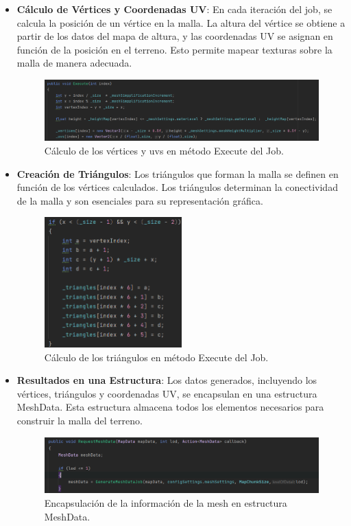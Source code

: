 \begin{itemize}
\item \textbf{Cálculo de Vértices y Coordenadas UV}: En cada iteración del job, se calcula la posición de un vértice en la malla. La altura del vértice se obtiene a partir de los datos del mapa de altura, y las coordenadas UV se asignan en función de la posición en el terreno. Esto permite mapear texturas sobre la malla de manera adecuada. 

\begin{figure}[h]
    \centering
    \includegraphics[width=1\textwidth]{img/codes/CalculoVerticesYUVs.png}
    \caption{Cálculo de los vértices y uvs en método Execute del Job.}
\end{figure}

\item \textbf{Creación de Triángulos}: Los triángulos que forman la malla se definen en función de los vértices calculados. Los triángulos determinan la conectividad de la malla y son esenciales para su representación gráfica.
\begin{figure}[h]
    \centering
    \includegraphics[width=0.5\textwidth]{img/codes/CalculoTriangulos.png}
    \caption{Cálculo de los triángulos en método Execute del Job.}
\end{figure} 
\item \textbf{Resultados en una Estructura}: Los datos generados, incluyendo los vértices, triángulos y coordenadas UV, se encapsulan en una estructura MeshData. Esta estructura almacena todos los elementos necesarios para construir la malla del terreno.
\begin{figure}[h]
    \centering
    \includegraphics[width=1\textwidth]{img/codes/CreacionMeshData.png}
    \caption{Encapsulación de la información de la mesh en estructura MeshData.}
\end{figure}  
\end{itemize}

